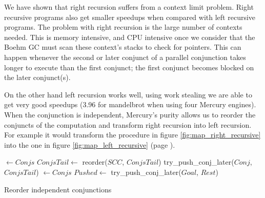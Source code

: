 

We have shown that right recursion suffers from a context limit problem.
Right recursive programs also get smaller speedups when compared with left
recursive programs.
The problem with right recursion is the large number of contexts needed.
This is memory intensive, and CPU intensive once we consider that
the Boehm GC must scan these context's stacks to check for pointers.
This can happen whenever the second or later
conjunct of a parallel conjunction
takes longer to execute than the first conjunct;
the first conjunct becomes blocked on the later conjunct(s).

On the other hand left recursion works well,
using work stealing we are able to get very good speedups (3.96 for
mandelbrot when using four Mercury engines).
When the conjunction is independent,
Mercury's purity allows us to reorder the conjuncts of the computation and
transform right recursion into left recursion.
For example it would transform the procedure in figure
\ref{fig:map_right_recursive} into the one in figure
\ref{fig:map_left_recursive} (page \pageref{fig:map_right_recursive}).

\begin{algorithm}
\begin{algorithmic}[1]
        \State \Return \nil
    \Else
        \State {} $\gets Conjs$
        \State $ConjsTail \gets$ reorder($SCC$, $ConjsTail$)
            \State \Return {}
        \Else
            \State \Return try\_push\_conj\_later($Conj$, $ConjsTail$)
        \EndIf
    \EndIf
\EndProcedure
{}
        \State \Return {}
    \Else
        \State {} $\gets Conjs$
            \State $Pushed \gets$ try\_push\_conj\_later($Goal$, $Rest$)
            \State \Return {}
        \Else
            \State \Return {}
        \EndIf
    \EndIf
\EndProcedure
\end{algorithmic}
\caption{Reorder independent conjunctions}
\label{alg:reorder_conjunction}
\end{algorithm}

